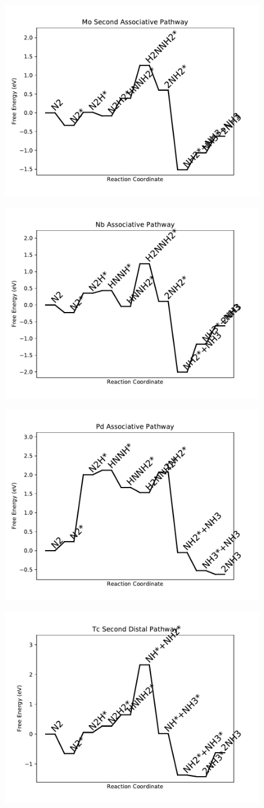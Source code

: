 \begin{figure}
\includegraphics[width=0.5\linewidth]{data/plots/Mo_associative_2.pdf}
\label{fig:Mo_associative_2}
\end{figure}

\begin{figure}
\includegraphics[width=0.5\linewidth]{data/plots/Nb_associative.pdf}
\label{fig:Nb_associative}
\end{figure}

\begin{figure}
\includegraphics[width=0.5\linewidth]{data/plots/Pd_associative.pdf}
\label{fig:Pd_associative}
\end{figure}

\begin{figure}
\includegraphics[width=0.5\linewidth]{data/plots/Tc_distal_2.pdf}
\label{fig:Tc_distal_2}
\end{figure}

